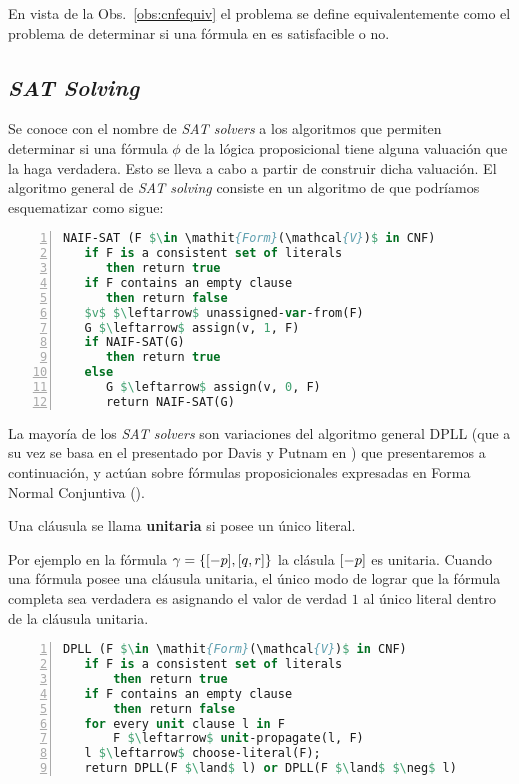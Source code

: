 En vista de la Obs.~\ref{obs:cnfequiv} el problema \sat se define equivalentemente
como el problema de determinar si una fórmula en \cnf es satisfacible o no.


\subsection{\emph{SAT Solving}}

Se conoce con el nombre de \emph{SAT solvers} a los algoritmos que permiten
determinar si una fórmula $\phi$ de la lógica proposicional tiene alguna
valuación que la haga verdadera. Esto se lleva a cabo a partir de construir dicha valuación.
El algoritmo general de  \emph{SAT solving} consiste en un algoritmo de \bt que podríamos esquematizar como sigue:

\begin{lstlisting}[mathescape,language=Pascal,frame=single,numbers=left,caption={Algoritmo \emph{naïf}},label=naif] 
NAIF-SAT (F $\in \mathit{Form}(\mathcal{V})$ in CNF)
   if F is a consistent set of literals
      then return true
   if F contains an empty clause
      then return false
   $v$ $\leftarrow$ unassigned-var-from(F)
   G $\leftarrow$ assign(v, 1, F)
   if NAIF-SAT(G)
      then return true
   else
      G $\leftarrow$ assign(v, 0, F)
      return NAIF-SAT(G)
\end{lstlisting}

La mayoría de los \emph{SAT solvers} son variaciones del algoritmo general DPLL\cite{Davis:1962:MPT:368273.368557} (que a su vez se basa en el presentado por Davis y Putnam en \cite{Davis:1960:CPQ:321033.321034}) que presentaremos a continuación, y actúan sobre fórmulas proposicionales expresadas en Forma Normal Conjuntiva (\cnf). 

\begin{definition} 
 Una cláusula se llama \textbf{unitaria} si
posee un único literal.
\end{definition}

Por ejemplo en la fórmula $\gamma = \{[-p], [q, r]\}$ la clásula $[-p]$ es
unitaria. Cuando una fórmula \cnf posee una cláusula unitaria, el único modo de
lograr que la fórmula completa sea verdadera es asignando el valor de verdad
$1$ al único literal dentro de la cláusula unitaria.

\begin{lstlisting}[mathescape,language=Pascal,frame=single,numbers=left,caption={Algoritmo DPLL},label=DPLL] 
DPLL (F $\in \mathit{Form}(\mathcal{V})$ in CNF)
   if F is a consistent set of literals
       then return true
   if F contains an empty clause
       then return false
   for every unit clause l in F
       F $\leftarrow$ unit-propagate(l, F)
   l $\leftarrow$ choose-literal(F);
   return DPLL(F $\land$ l) or DPLL(F $\land$ $\neg$ l)
\end{lstlisting}

